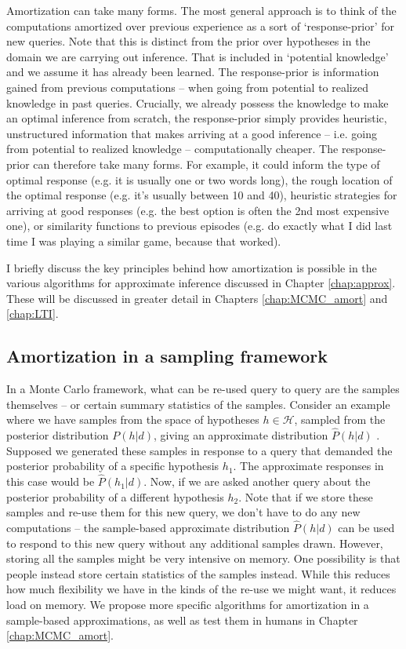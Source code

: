 Amortization can take many forms. The most general approach is to think of the computations amortized over previous experience as a sort of `response-prior' for new queries. Note that this is distinct from the prior over hypotheses in the domain we are carrying out inference. That is included in `potential knowledge' and we assume it has already been learned. The response-prior is information gained from previous computations -- when going from potential to realized knowledge in past queries. Crucially, we already possess the knowledge to make an optimal inference from scratch, the response-prior simply provides heuristic, unstructured information that makes arriving at a good inference -- i.e. going from potential to realized knowledge -- computationally cheaper. The response-prior can therefore take many forms. For example, it could inform the type of optimal response (e.g. it is usually one or two words long), the rough location of the optimal response (e.g. it's usually between 10 and 40), heuristic strategies for arriving at good responses (e.g. the best option is often the 2nd most expensive one), or similarity functions to previous episodes (e.g. do exactly what I did last time I was playing a similar game, because that worked). 

I briefly discuss the key principles behind how amortization is possible in the various algorithms for approximate inference discussed in Chapter \ref{chap:approx}. These will be discussed in greater detail in Chapters \ref{chap:MCMC_amort} and \ref{chap:LTI}.

\subsection*{Amortization in a sampling framework} 

In a Monte Carlo framework, what can be re-used query to query are the samples themselves -- or certain summary statistics of the samples. Consider an example where we have samples from the space of hypotheses $h \in \mathcal{H}$, sampled from the posterior distribution $P(h | d)$, giving an approximate distribution $\hat{P}(h | d)$ . Supposed we generated these samples in response to a query that demanded the posterior probability of a specific hypothesis $h_1$. The approximate responses in this case would be $\hat{P}(h_1 |d)$. Now, if we are asked another query about the posterior probability of a different hypothesis $h_2$. Note that if we store these samples and re-use them for this new query, we don't have to do any new computations -- the sample-based approximate distribution $\hat{P}(h | d)$ can be used to respond to this new query without any additional samples drawn. However, storing all the samples might be very intensive on memory. One possibility is that people instead store certain statistics of the samples instead. While this reduces how much flexibility we have in the kinds of the re-use we might want, it reduces load on memory. We propose more specific algorithms for amortization in a sample-based approximations, as well as test them in humans in Chapter \ref{chap:MCMC_amort}.

